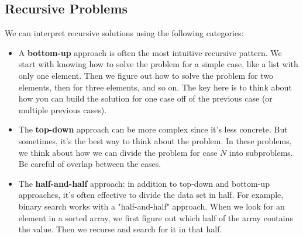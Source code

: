 \documentclass{article}
\begin{document}
    \subsection{Recursive Problems}
    We can interpret recursive solutions using the following categories:
    \begin{itemize}
        \item A \textbf{bottom-up} approach is often the most intuitive recursive pattern. We start with knowing how to solve the problem for a simple case, like a list with only one element. Then we figure out how to solve the problem for two elements, then for three elements, and so on. The key here is to think about how you can build the solution for one case off of the previous case (or multiple previous cases).
        
        \item The \textbf{top-down} approach can be more complex since it's less concrete. But sometimes, it's the best way to think about the problem. In these problems, we think about how we can divide the problem for case $N$ into subproblems. Be careful of overlap between the cases. 
        
        \item The \textbf{half-and-half} approach: in addition to top-down and bottom-up approaches, it's often effective to divide the data set in half. For example, binary search works with a "half-and-half" approach. When we look for an element in a sorted array, we first figure out which half of the array contains the value. Then we recurse and search for it in that half.
    \end{itemize}
    
    
        
        
        
\end{document}
